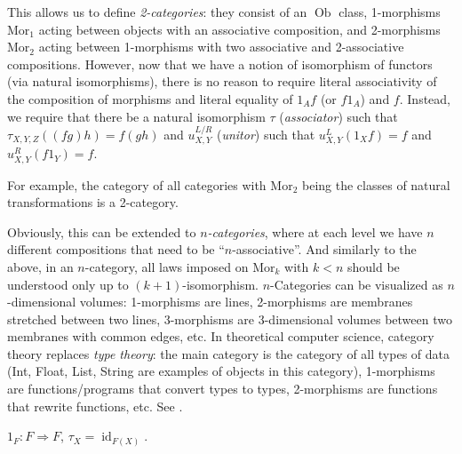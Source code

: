 \documentclass[english,letterpaper]{article}%
\numberwithin{equation}{section}
\numberwithin{figure}{section}
\numberwithin{table}{section}
\theoremstyle{definition}
\theoremstyle{definition}
\theoremstyle{definition}
\theoremstyle{plain}
\theoremstyle{plain}
\theoremstyle{plain}
\theoremstyle{plain}
\theoremstyle{remark}
\theoremstyle{remark}
\DeclareMathOperator{\id}{id}
\DeclareMathOperator{\ob}{Ob}
\begin{document}
\begin{rem}
This allows us to define \emph{2-categories}: they consist of an
$\ob$ class, 1-morphisms $\mathrm{Mor}_{1}$ acting between objects
with an associative composition, and 2-morphisms $\mathrm{Mor}_{2}$
acting between 1-morphisms with two associative and 2-associative
compositions. However, now that we have a notion of isomorphism of
functors (via natural isomorphisms), there is no reason to require
literal associativity of the composition of morphisms and literal
equality of $1_{A}f$ (or $f1_{A}$) and $f$. Instead, we require
that there be a natural isomorphism $\tau$ (\emph{associator})
such that $\tau_{X,Y,Z}\left(\left(fg\right)h\right)=f\left(gh\right)$
and $u_{X,Y}^{L/R}$ (\emph{unitor}) such that $u_{X,Y}^{L}\left(1_{X}f\right)=f$
and $u_{X,Y}^{R}\left(f1_{Y}\right)=f$.

For example, the category of all categories with $\mathrm{Mor}_{2}$
being the classes of natural transformations is a 2-category.

Obviously, this can be extended to \emph{$n$-categories}, where
at each level we have $n$ different compositions that need to be
``$n$-associative''. And similarly to the above, in an $n$-category,
all laws imposed on $\mathrm{Mor}_{k}$ with $k<n$ should be understood
only up to $\left(k+1\right)$-isomorphism. $n$-Categories can be
visualized as $n$-dimensional volumes: 1-morphisms are lines, 2-morphisms
are membranes stretched between two lines, 3-morphisms are 3-dimensional
volumes between two membranes with common edges, etc. In theoretical
computer science, category theory replaces \emph{type theory}: the
main category is the category of all types of data (Int, Float, List,
String are examples of objects in this category), 1-morphisms are
functions/programs that convert types to types, 2-morphisms are functions
that rewrite functions, etc. See \cite{CTCS}.
\end{rem}
\begin{example}
$1_{F}:F\Longrightarrow F$, $\tau_{X}=\id_{F(X)}$.
\end{example}
%
\end{document}
